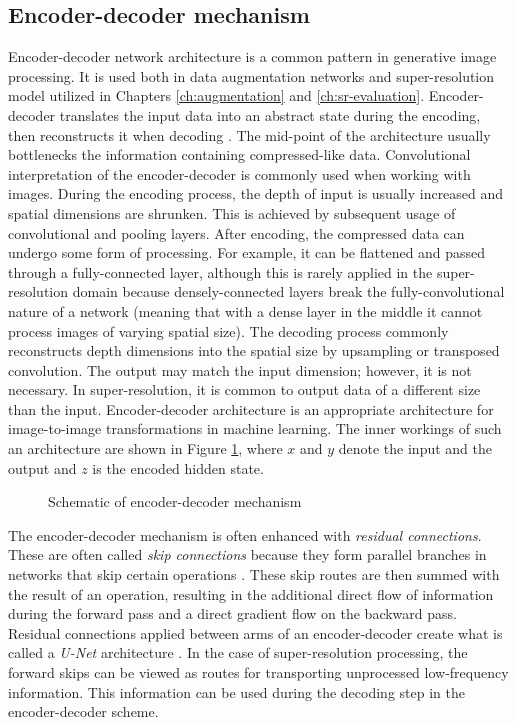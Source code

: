 \subsection{Encoder-decoder mechanism}
\label{sec:encoder-decoder}
Encoder-decoder network architecture is a common pattern in generative image processing.
It is used both in data augmentation networks and super-resolution model utilized in Chapters \ref{ch:augmentation} and \ref{ch:sr-evaluation}.
Encoder-decoder translates the input data into an abstract state during the encoding, then reconstructs it when decoding \cite{sevetlidis-2016-encoderdecoder}.
The mid-point of the architecture usually bottlenecks the information containing compressed-like data.
Convolutional interpretation of the encoder-decoder is commonly used when working with images.
During the encoding process, the depth of input is usually increased and spatial dimensions are shrunken.
This is achieved by subsequent usage of convolutional and pooling layers.
After encoding, the compressed data can undergo some form of processing.
For example, it can be flattened and passed through a fully-connected layer, although this is rarely applied in the super-resolution domain because densely-connected layers break the fully-convolutional \cite{long-2014-fullyconv} nature of a network (meaning that with a dense layer in the middle it cannot process images of varying spatial size).
The decoding process commonly reconstructs depth dimensions into the spatial size by upsampling or transposed convolution.
The output may match the input dimension; however, it is not necessary.
In super-resolution, it is common to output data of a different size than the input.
Encoder-decoder architecture is an appropriate architecture for image-to-image transformations in machine learning.
The inner workings of such an architecture are shown in Figure \ref{fig:encoder-decoder}, where $ x $ and $ y $ denote the input and the output and $ z $ is the encoded hidden state. 
\begin{figure}
    \centering
    
    \caption{Schematic of encoder-decoder mechanism}
    \label{fig:encoder-decoder}
\end{figure}

The encoder-decoder mechanism is often enhanced with \textit{residual connections}.
These are often called \textit{skip connections} because they form parallel branches in networks that skip certain operations \cite{cholet-2018-deeplearning}.
These skip routes are then summed with the result of an operation, resulting in the additional direct flow of information during the forward pass and a direct gradient flow on the backward pass.
Residual connections applied between arms of an encoder-decoder create what is called a \textit{U-Net} architecture \cite{ronnenberger-2015-unet}.
In the case of super-resolution processing, the forward skips can be viewed as routes for transporting unprocessed low-frequency information.
This information can be used during the decoding step in the encoder-decoder scheme.

